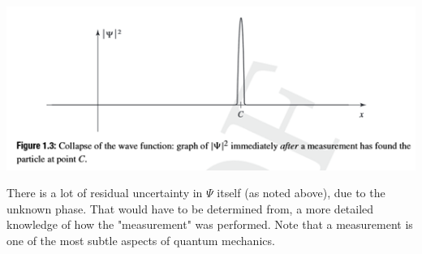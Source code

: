 \documentclass{article}
\begin{document}
\includegraphics[width = 0.7 \textwidth]{Lecture02/3.png}

There is a lot of residual uncertainty in $\Psi$ itself (as noted above), due to the unknown phase. That would have to be determined from, a more detailed knowledge of how the "measurement" was performed. Note that a measurement is one of the most subtle aspects of quantum mechanics. 
\end{document}
